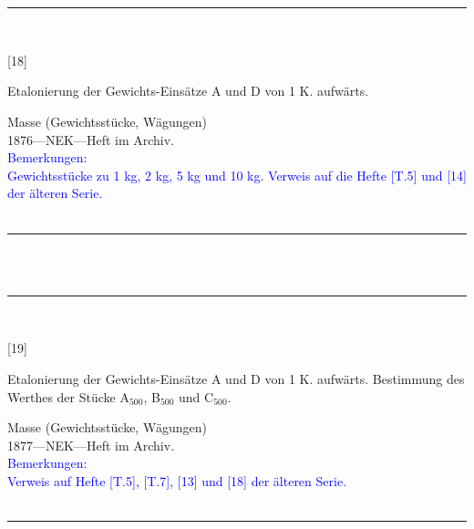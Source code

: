 \\
\vspace*{-2.5pt}\\
\parbox{\textwidth}{%
\rule{\textwidth}{1pt}\vspace*{-3mm}\\
\begin{minipage}[t]{0.15\textwidth}\vspace{0pt}
\Huge\rule[-4mm]{0cm}{1cm}[18]
\end{minipage}
\hfill
\begin{minipage}[t]{0.85\textwidth}\vspace{0pt}
\large Etalonierung der Gewichts-Einsätze A und D von 1 K. aufwärts.\rule[-2mm]{0mm}{2mm}
\end{minipage}
{\footnotesize\flushright
Masse (Gewichtsstücke, Wägungen)\\
}
1876\quad---\quad NEK\quad---\quad Heft im Archiv.\\
\textcolor{blue}{Bemerkungen:\\{}
Gewichtsstücke zu 1 kg, 2 kg, 5 kg und 10 kg. Verweis auf die Hefte [T.5] und [14] der älteren Serie.\\{}
}
\\[-15pt]
\rule{\textwidth}{1pt}
}
\\
\vspace*{-2.5pt}\\
\parbox{\textwidth}{%
\rule{\textwidth}{1pt}\vspace*{-3mm}\\
\begin{minipage}[t]{0.15\textwidth}\vspace{0pt}
\Huge\rule[-4mm]{0cm}{1cm}[19]
\end{minipage}
\hfill
\begin{minipage}[t]{0.85\textwidth}\vspace{0pt}
\large Etalonierung der Gewichts-Einsätze A und D von 1 K. aufwärts. Bestimmung des Werthes der Stücke A$_\mathrm{500}$, B$_\mathrm{500}$ und C$_\mathrm{500}$.\rule[-2mm]{0mm}{2mm}
\end{minipage}
{\footnotesize\flushright
Masse (Gewichtsstücke, Wägungen)\\
}
1877\quad---\quad NEK\quad---\quad Heft im Archiv.\\
\textcolor{blue}{Bemerkungen:\\{}
Verweis auf Hefte [T.5], [T.7], [13] und [18] der älteren Serie.\\{}
}
\\[-15pt]
\rule{\textwidth}{1pt}
}
